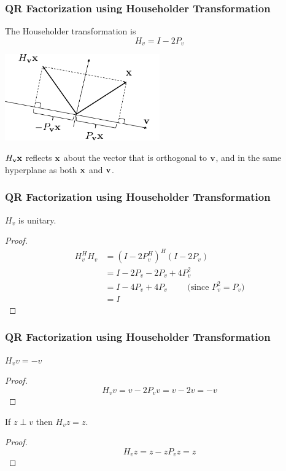\documentclass{beamer}
\begin{document}
\begin{frame}\frametitle{QR Factorization using Householder Transformation}
	The Householder transformation is
	\[ 
		H_v = I - 2P_v 
	\]

	\begin{center}
	\includegraphics[width=0.5\textwidth]{figures/chap5_householder_3}
	\end{center}

	$H_{\mathbf{v}} \mathbf{x}$ reflects $\mathbf{x}$ about the vector that is orthogonal to $\mathbf{v}$, and in the same hyperplane as both $\mathbf{x}$ and $\mathbf{v}$.
	
\end{frame}


\begin{frame}\frametitle{QR Factorization using Householder Transformation}
	\begin{lemma}
		$H_v$ is unitary.
	\end{lemma}
	\begin{proof}
		\begin{align*}
			H_v^HH_v 
				&= (I - 2P_v^H)^H(I - 2P_v)\\
				&= I - 2P_v - 2P_v + 4P_v^2\\
				&= I - 4P_v + 4P_v \qquad \text{ (since $P_v^2 = P_v$)}\\
				&= I
		\end{align*}
	\end{proof}
\end{frame}

\begin{frame}\frametitle{QR Factorization using Householder Transformation}
	\begin{lemma}
		$H_vv = -v$
	\end{lemma}
	\begin{proof}
		\[
			H_vv = v - 2P_vv = v - 2v = -v 
		\]
	\end{proof}
	
	\begin{lemma}
		If $z \perp v$ then $H_vz = z$.
	\end{lemma}
	\begin{proof}
		\[ 
			H_vz = z - zP_vz = z 
		\]
	\end{proof}			
\end{frame}
\end{document}
